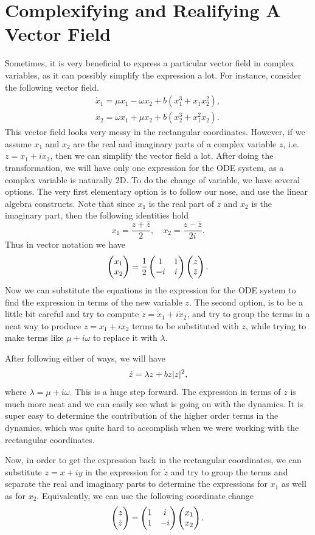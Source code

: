 \section{Complexifying and Realifying A Vector Field}
Sometimes, it is very beneficial to express a particular vector field in complex variables, as it can possibly simplify the expression a lot. For instance, consider the following vector field.
\begin{align*}
	\dot{x}_1 = \mu x_1 - \omega x_2 + b(x_1^3 + x_1x_2^2),\\
	\dot{x}_2 = \omega x_1 + \mu x_2 + b(x_2^3 + x_1^2x_2).
\end{align*}
This vector field looks very messy in the rectangular coordinates. However, if we assume $x_1$ and $x_2$ are the real and imaginary parts of a complex variable $z$, i.e. $z = x_1 + ix_2$, then we can simplify the vector field a lot. After doing the transformation, we will have only one expression for the ODE system, as a complex variable is naturally 2D. To do the change of variable, we have several options. The very first elementary option is to follow our nose, and use the linear algebra constructs. Note that since $x_1$ is the real part of $z$ and $x_2$ is the imaginary part, then the following identities hold
\[ x_1 = \frac{z +\bar{z}}{2}, \quad x_2 = \frac{z - \bar{z} }{2i}. \]
Thus in vector notation we have
\[ \begin{pmatrix} x_1 \\ x_2 \end{pmatrix} = \frac{1}{2}\begin{pmatrix} 1 & 1 \\ -i & i \end{pmatrix} \begin{pmatrix} z \\ \bar{z} \end{pmatrix}. \]
Now we can substitute the equations in the expression for the ODE system to find the expression in terms of the new variable $z$. The second option, is to be a little bit careful and try to compute $\dot{z} = \dot{x}_1 + i \dot{x}_2$, and try to group the terms in a neat way to produce $z = x_1 + i x_2$ terms to be substituted with $z$, while trying to make terms like $\mu + i\omega$ to replace it with $\lambda$. 

After following either of ways, we will have
\[ \dot{z} = \lambda z + b z |z|^2, \]
where $\lambda = \mu + i\omega$. This is a huge step forward. The expression in terms of $z$ is much more neat and we can easily see what is going on with the dynamics. It is super easy to determine the contribution of the higher order terms in the dynamics, which was quite hard to accomplish when we were working with the rectangular coordinates.

Now, in order to get the expression back in the rectangular coordinates, we can substitute $z = x + iy$ in the expression for $\dot{z}$ and try to group the terms and separate the real and imaginary parts to determine the expressions for $x_1$ as well as for $x_2$. Equivalently, we can use the following coordinate change
\[  \begin{pmatrix} z \\ \bar{z} \end{pmatrix} = \begin{pmatrix} 1 & i \\ 1 & -i \end{pmatrix} \begin{pmatrix} x_1 \\ x_2 \end{pmatrix}.  \]
